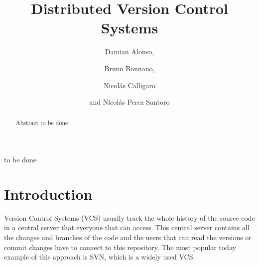 \documentclass[%
	final,
	notitlepage,
	narroweqnarray,
	inline,
	twoside,
	]{ieee}
\begin{document}
\title[Distributed Version Control Systems]{%
       Distributed Version Control Systems}

\author[GRUPOAPIT]{Damian Alonso,
\and{} Bruno Bonnano,
\and{} Nicol\'{a}s Calligaro
\and{}and Nicol\'{a}s Perez Santoro
}



\maketitle               

\begin{abstract} 
Abstract to be done
\end{abstract}

\begin{keywords}
to be done
\end{keywords}

\section{Introduction}


\PARstart Version Control Systems (VCS) usually track the whole history of the
source code in a central server that everyone that can access. This 
central server contains all the changes and branches of the code and 
the users that can read the versions or commit changes have to connect 
to this repository. The most popular today example of this approach is SVN, which is a 
widely used VCS.
\end{document}
